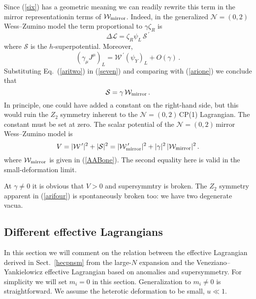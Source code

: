 \documentclass[epsfig,12pt]{article}
\def\beq{\begin{equation}}
\def\eeq{\end{equation}}
\newcommand{\nzt}{${\mathcal N}=(0,2)\,$}
\newcommand{\cell}{{\mathcal L}}
\newcommand{\cw}{{\mathcal W}}
\newcommand{\cs}{{\mathcal S}}
\def\beq{\begin{equation}}
\def\eeq{\end{equation}}
\begin{document}
{Since (\ref{six}) has a geometric meaning we can readily rewrite this term in the mirror representationin terms of 
${\mathcal W}_{\rm mirror}$.
 Indeed, in the generalized \nzt Wess--Zumino model the term proportional to $\gamma \zeta_R$ is
 \cite{SYneww}
 \beq
 \Delta\cell = \zeta_R \psi_L\,{\mathcal S}^{\,\prime}
 \label{arione}
 \eeq
 where ${\mathcal S}$ is the $h$-superpotential. Moreover,
 \beq
 \left(\gamma_\mu J^\mu\right)_L = {\mathcal W}^{\,\prime} \left(\psi_Y\right)_{L} +O(\gamma)\,.
  \label{aritwo}
 \eeq
Substituting Eq.~(\ref{aritwo}) in (\ref{seven}) and comparing with (\ref{arione}) we conclude that
\beq
{\mathcal S} = \gamma\,{\mathcal W}_{\rm mirror}\,.
  \label{arithree}
 \eeq
 In principle, one could have added a constant on the right-hand side, but this would ruin the $Z_2$ 
 symmetry inherent to the \nzt CP(1) Lagrangian. The constant must be set at zero. 
 The scalar potential of the \nzt mirror Wess--Zumino model 
  is \cite{SYneww}
 \beq
 V= |\cw^{\,\prime} |^2+|\cs|^2 = |\cw^{\,\prime}_{\rm mirror} |^2 +|\gamma |^2\,|\cw_{\rm mirror} |^2\,.
   \label{arifour}
 \eeq
 where $\cw_{\rm mirror} $ is given in (\ref{AABone}).
 The second equality here is valid in the small-deformation limit.
 
At $\gamma \neq 0$ it is obvious that $V>0$ and supersymmtry is broken.
The $Z_2$ symmetry apparent in (\ref{arifour}) is spontaneously broken too:
we have two degenerate vacua.



\subsection{Different effective Lagrangians}

In this section we will comment on the relation between the
effective Lagrangian derived in Sect.~\ref{hecpnsm} from the large-$N$ expansion
 and the Veneziano--Yankielowicz
effective Lagrangian based on  anomalies and supersymmetry.
For simplicity we will set $m_i =0$ in this section. 
Generalization to  $m_i \neq 0$ is straightforward. We  assume the heterotic deformation to be small, $u\ll1$.

}
\end{document}
